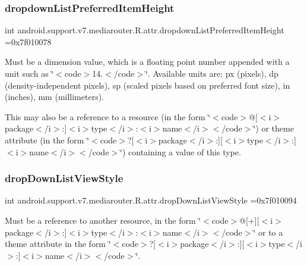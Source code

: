 \subsubsection{\texorpdfstring{dropdown\+List\+Preferred\+Item\+Height}{dropdownListPreferredItemHeight}}
{\footnotesize\ttfamily int android.\+support.\+v7.\+mediarouter.\+R.\+attr.\+dropdown\+List\+Preferred\+Item\+Height =0x7f010078\hspace{0.3cm}{\ttfamily [static]}}

Must be a dimension value, which is a floating point number appended with a unit such as \char`\"{}$<$code$>$14.\+5sp$<$/code$>$\char`\"{}. Available units are\+: px (pixels), dp (density-\/independent pixels), sp (scaled pixels based on preferred font size), in (inches), mm (millimeters). 

This may also be a reference to a resource (in the form \char`\"{}$<$code$>$@\mbox{[}$<$i$>$package$<$/i$>$\+:\mbox{]}$<$i$>$type$<$/i$>$\+:$<$i$>$name$<$/i$>$$<$/code$>$\char`\"{}) or theme attribute (in the form \char`\"{}$<$code$>$?\mbox{[}$<$i$>$package$<$/i$>$\+:\mbox{]}\mbox{[}$<$i$>$type$<$/i$>$\+:\mbox{]}$<$i$>$name$<$/i$>$$<$/code$>$\char`\"{}) containing a value of this type. \mbox{\label{classandroid_1_1support_1_1v7_1_1mediarouter_1_1R_1_1attr_a6f8a3a2e0500edd730fb01e396a74907}} 
\subsubsection{\texorpdfstring{drop\+Down\+List\+View\+Style}{dropDownListViewStyle}}
{\footnotesize\ttfamily int android.\+support.\+v7.\+mediarouter.\+R.\+attr.\+drop\+Down\+List\+View\+Style =0x7f010094\hspace{0.3cm}{\ttfamily [static]}}

Must be a reference to another resource, in the form \char`\"{}$<$code$>$@\mbox{[}+\mbox{]}\mbox{[}$<$i$>$package$<$/i$>$\+:\mbox{]}$<$i$>$type$<$/i$>$\+:$<$i$>$name$<$/i$>$$<$/code$>$\char`\"{} or to a theme attribute in the form \char`\"{}$<$code$>$?\mbox{[}$<$i$>$package$<$/i$>$\+:\mbox{]}\mbox{[}$<$i$>$type$<$/i$>$\+:\mbox{]}$<$i$>$name$<$/i$>$$<$/code$>$\char`\"{}. \mbox{\label{classandroid_1_1support_1_1v7_1_1mediarouter_1_1R_1_1attr_af7eacd6e8195cfde4becb505c6a07dc5}} 
